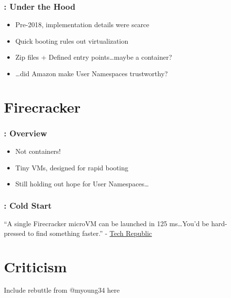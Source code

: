 \documentclass{beamer}
\begin{document}
\begin{frame}
	\frametitle{\insertsection : Under the Hood}
	\begin{itemize}
		\pause \item Pre-2018, implementation details were scarce
		\pause \item Quick booting rules out virtualization
		\pause \item Zip files + Defined entry points\ldots maybe a container?
		\pause \item \ldots did Amazon make User Namespaces trustworthy?
	\end{itemize}
\end{frame}
 
\section{Firecracker}
\frame{\sectionpage}

\begin{frame}
	\frametitle{\insertsection : Overview}
	\begin{itemize}
		\pause \item Not containers!
		\pause \item Tiny VMs, designed for rapid booting
		\pause \item Still holding out hope for User Namespaces\ldots
	\end{itemize}
\end{frame}

\begin{frame}
	\frametitle{\insertsection : Cold Start}
	``A single Firecracker microVM can be launched in \alert{125 ms}\ldots You'd be
	hard-pressed to find something faster.''
	- \href{https://www.techrepublic.com/article/aws-firecracker-10-things-every-tech-pro-should-know/}{Tech Republic}
\end{frame}

 
\section{Criticism}
\frame{\sectionpage}

\begin{frame}
	Include rebuttle from @myoung34 here
\end{frame}
\end{document}
